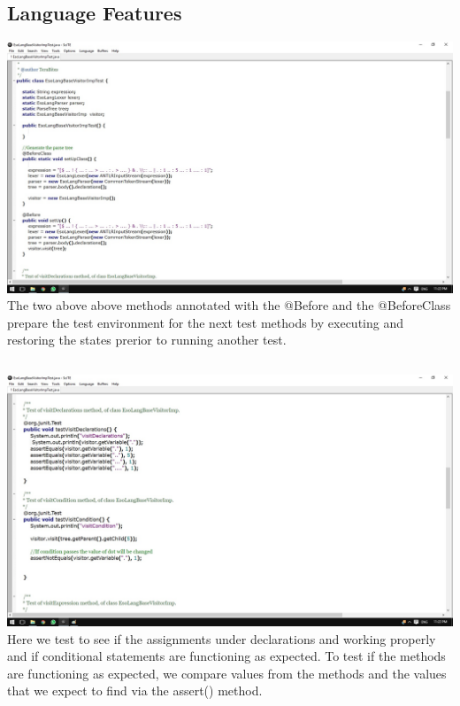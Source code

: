 \documentclass[english]{article}
\begin{document}
		\subsection{Language Features}
			\includegraphics[width=\linewidth]{test1.jpg}
			\\[12pt]
			The two above above methods annotated with the @Before and the @BeforeClass prepare the test environment for the next test methods by executing and restoring the states prerior to running another test. 
			\subsection{}
			\includegraphics[width=\linewidth]{test2.jpg}
			\\[12pt]	
			Here we test to see if the assignments under declarations and working properly and if conditional statements are functioning as expected.
			To test if the methods are functioning as expected, we compare values from the methods and the values that	we expect to find via the assert() method.	
\end{document}
